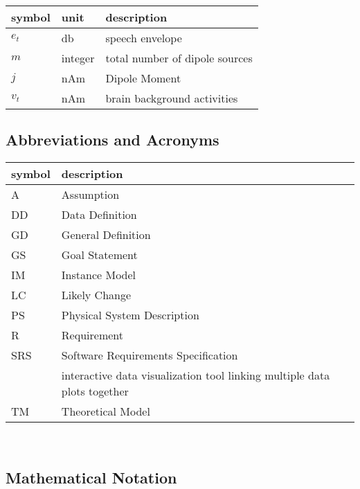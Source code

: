\documentclass[12pt]{article}
\begin{document}
\renewcommand{\arraystretch}{1.2}
\noindent \begin{longtable*}{l l p{12cm}} \toprule
\textbf{symbol} & \textbf{unit} & \textbf{description}\\
\midrule 
$e_t$ & db & speech envelope\\
$m$ & integer & total number of dipole sources\\
$j$ & nAm & Dipole Moment\\
$v_t$ & nAm & brain background activities\\

\bottomrule
\end{longtable*}

\subsection{Abbreviations and Acronyms}

\renewcommand{\arraystretch}{1.2}
\begin{tabular}{l l} 
  \toprule		
  \textbf{symbol} & \textbf{description}\\
  \midrule 
  A & Assumption\\
  DD & Data Definition\\
  GD & General Definition\\
  GS & Goal Statement\\
  IM & Instance Model\\
  LC & Likely Change\\
  PS & Physical System Description\\
  R & Requirement\\
  SRS & Software Requirements Specification\\
  \progname{} & interactive data visualization tool linking multiple data plots together\\
  TM & Theoretical Model\\
  \bottomrule
\end{tabular}\\
\subsection{Mathematical Notation}
\end{document}
